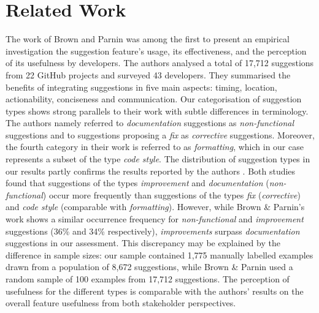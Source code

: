 \section{Related Work}
\label{sec:relwork}

The work of Brown and Parnin \cite{Brown_Suggestions_2020} was among the first to present an empirical investigation the suggestion feature's usage, its effectiveness, and the perception of its usefulness by developers.
The authors analysed a total of 17,712 suggestions from 22 GitHub projects and surveyed 43 developers.
They summarised the benefits of integrating suggestions in five main aspects: timing, location, actionability, conciseness and communication.
Our categorisation of suggestion types shows strong parallels to their work  with subtle differences in  terminology.
The authors namely referred to \textit{documentation} suggestions as \textit{non-functional} suggestions and to suggestions proposing a \textit{fix} as \textit{corrective} suggestions.
Moreover, the fourth category in their work is referred to as \textit{formatting}, which in our case represents a subset of the type \textit{code style}.
The distribution of suggestion types in our results partly confirms the results reported by the authors \cite{Brown_Suggestions_2020}.
Both studies found that suggestions of the types \textit{improvement} and \textit{documentation}  (\textit{non-functional}) occur more  frequently than suggestions of the types \textit{fix} (\textit{corrective}) and \textit{code style} (comparable with \textit{formatting}).
However, while Brown \& Parnin's work shows a similar occurrence frequency for \textit{non-functional} and \textit{improvement} suggestions (36\% and 34\% respectively), \textit{improvements} surpass \textit{documentation} suggestions in our assessment.
This discrepancy may be explained  by the difference in sample sizes: our sample contained 1,775 manually labelled examples drawn from a population of 8,672 suggestions, while Brown \& Parnin used a random sample of 100 examples from 17,712 suggestions.
The perception of usefulness for the different types is comparable with the authors' results on the overall feature usefulness from both stakeholder perspectives.


